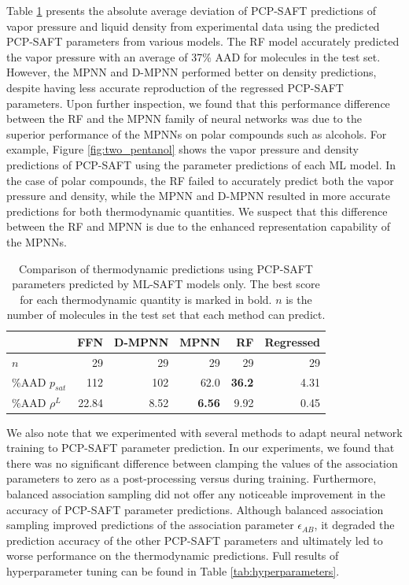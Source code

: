 Table \ref{tab:thermo_parameters} presents the absolute average deviation of PCP-SAFT predictions of vapor pressure and liquid density from experimental data using the predicted PCP-SAFT parameters from various models. The RF model accurately predicted the vapor pressure with an average of 37\% AAD for molecules in the test set. However, the MPNN and D-MPNN performed better on density predictions, despite having less accurate reproduction of the regressed PCP-SAFT parameters. Upon further inspection, we found that this performance difference between the RF and the MPNN family of neural networks was due to the superior performance of the MPNNs on polar compounds such as alcohols. For example, Figure \ref{fig:two_pentanol} shows the vapor pressure and density predictions of PCP-SAFT using the parameter predictions of each ML model. In the case of polar compounds, the RF failed to accurately predict both the vapor pressure and density, while the MPNN and D-MPNN resulted in more accurate predictions for both thermodynamic quantities. We suspect that this difference between the RF and MPNN is due to the enhanced representation capability of the MPNNs.\cite{Gilmer2017, Ramsundar2017}

\begin{table}
	\caption{Comparison of thermodynamic predictions using PCP-SAFT parameters predicted by ML-SAFT models only. The best score for each thermodynamic quantity is
marked in bold. $n$ is the number of molecules in the test set that each method can
predict.}
	\label{tab:thermo_parameters}
	\begin{center}
		\begin{tabular}{lrrrr|r}
			 & FFN & D-MPNN & MPNN & RF & Regressed \\
			\hline
			$n$ & 29 & 29 & 29 & 29 & 29 \\
			\%AAD $p_{sat}$ & 112 & 102 & 62.0 & \textbf{36.2 }& 4.31 \\
			\%AAD $\rho^{L}$ & 22.84 & 8.52 & \textbf{6.56} & 9.92 & 0.45 \\
		\end{tabular}
	\end{center}
\end{table}

We also note that we experimented with several methods to adapt neural network training to PCP-SAFT parameter prediction. In our experiments, we found that there was no significant difference between clamping the values of the association parameters to zero as a post-processing versus during training. Furthermore, balanced association sampling did not offer any noticeable improvement in the accuracy of PCP-SAFT parameter predictions. Although balanced association sampling improved predictions of the association parameter $\epsilon_{AB}$, it degraded the prediction accuracy of the other PCP-SAFT parameters and ultimately led to worse performance on the thermodynamic predictions. Full results of hyperparameter tuning can be found in Table \ref{tab:hyperparameters}.

